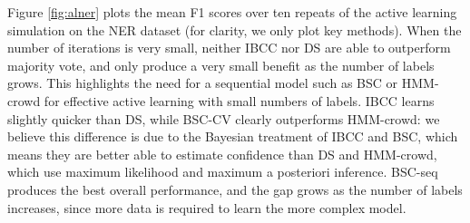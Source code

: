  Figure \ref{fig:alner} plots the mean F1 scores over ten repeats of the active learning simulation on the NER dataset (for clarity, we only plot key methods).
 When the number of iterations is very small, neither IBCC nor DS are able to outperform majority vote, and only produce a very small
 benefit as the number of labels grows. This highlights the need for a sequential model such as BSC or HMM-crowd for
 effective active learning with small numbers of labels.
 IBCC learns slightly quicker than DS,
 while BSC-CV clearly outperforms HMM-crowd: we believe this difference is due to the Bayesian treatment of IBCC and BSC,
 which means they are better able to estimate confidence than DS and HMM-crowd, which use maximum likelihood and maximum a posteriori inference.
 BSC-seq produces the best overall performance, and the gap grows as the number of labels increases, 
 since more data is required to learn the more complex model.  
